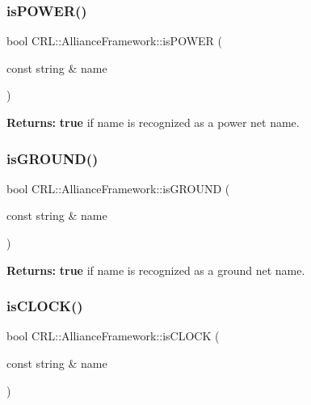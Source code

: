 \subsubsection{\texorpdfstring{is\+P\+O\+W\+E\+R()}{isPOWER()}}
{\footnotesize\ttfamily bool C\+R\+L\+::\+Alliance\+Framework\+::is\+P\+O\+W\+ER (\begin{DoxyParamCaption}\item[{const string \&}]{name }\end{DoxyParamCaption})\hspace{0.3cm}{\ttfamily [inline]}}

{\bfseries Returns\+:} {\bfseries true} if {\ttfamily name} is recognized as a power net name. \mbox{\label{classCRL_1_1AllianceFramework_a0dcd1a667226f37353fdf0ea232d9c5d}} 
\subsubsection{\texorpdfstring{is\+G\+R\+O\+U\+N\+D()}{isGROUND()}}
{\footnotesize\ttfamily bool C\+R\+L\+::\+Alliance\+Framework\+::is\+G\+R\+O\+U\+ND (\begin{DoxyParamCaption}\item[{const string \&}]{name }\end{DoxyParamCaption})\hspace{0.3cm}{\ttfamily [inline]}}

{\bfseries Returns\+:} {\bfseries true} if {\ttfamily name} is recognized as a ground net name. \mbox{\label{classCRL_1_1AllianceFramework_a79ae573b6b685c1796e29ccc15c1c146}} 
\subsubsection{\texorpdfstring{is\+C\+L\+O\+C\+K()}{isCLOCK()}}
{\footnotesize\ttfamily bool C\+R\+L\+::\+Alliance\+Framework\+::is\+C\+L\+O\+CK (\begin{DoxyParamCaption}\item[{const string \&}]{name }\end{DoxyParamCaption})\hspace{0.3cm}{\ttfamily [inline]}}

